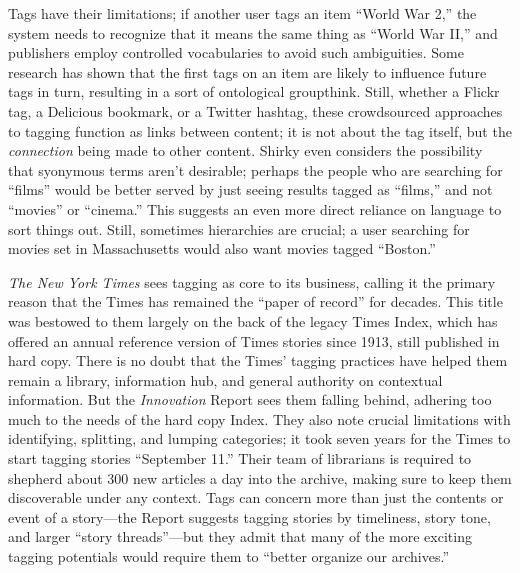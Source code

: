 Tags have their limitations; if another user tags an item ``World War 2,'' the system needs to recognize that it means the same thing as ``World War II,'' and publishers employ controlled vocabularies to avoid such ambiguities. Some research has shown that the first tags on an item are likely to influence future tags in turn, resulting in a sort of ontological groupthink.\autocite{cattuto_semiotic_2007} Still, whether a Flickr tag, a Delicious bookmark, or a Twitter hashtag, these crowdsourced approaches to tagging function as links between content; it is not about the tag itself, but the \emph{connection} being made to other content. Shirky even considers the possibility that syonymous terms aren't desirable; perhaps the people who are searching for ``films'' would be better served by just seeing results tagged as ``films,'' and not ``movies'' or ``cinema.''\autocite{shirky_ontology_2005} This suggests an even more direct reliance on language to sort things out. Still, sometimes hierarchies are crucial; a user searching for movies set in Massachusetts would also want movies tagged ``Boston.''

\emph{The New York Times} sees tagging as core to its business, calling it the primary reason that the Times has remained the ``paper of record'' for decades.\autocite[41]{_innovation_2014} This title was bestowed to them largely on the back of the legacy Times Index, which has offered an annual reference version of Times stories since 1913, still published in hard copy. There is no doubt that the Times' tagging practices have helped them remain a library, information hub, and general authority on contextual information. But the \emph{Innovation} Report sees them falling behind, adhering too much to the needs of the hard copy Index. They also note crucial limitations with identifying, splitting, and lumping categories; it took seven years for the Times to start tagging stories ``September 11.'' Their team of librarians is required to shepherd about 300 new articles a day into the archive, making sure to keep them discoverable under any context. Tags can concern more than just the contents or event of a story---the Report suggests tagging stories by timeliness, story tone, and larger ``story threads''---but they admit that many of the more exciting tagging potentials would require them to ``better organize our archives.''\autocite[41-42]{_innovation_2014}

